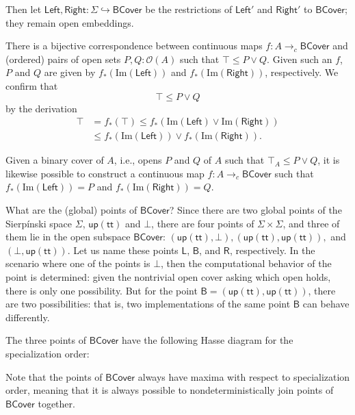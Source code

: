 \documentclass[conference]{IEEEtran}
\newcommand{\hookto}{\hookrightarrow}
\newcommand{\cto}{\to_c}
\newcommand{\Open}[1]{\mathcal{O}({#1})}
\newcommand{\Img}[1]{\text{Im}\left({#1}\right)}
\newcommand{\strue}{\mathsf{up}(\mathsf{tt})}
\newcommand{\sfalse}{\bot}
\newcommand{\BCover}{\mathsf{BCover}}
\begin{document}
Then let $\mathsf{Left}, \mathsf{Right} : \Sigma \hookto \BCover$ be the restrictions of $\mathsf{Left}'$ and $\mathsf{Right}'$ to $\BCover$; they remain open embeddings.

There is a bijective correspondence between continuous maps $f : A \cto \BCover$ and (ordered) pairs of open sets $P, Q : \Open{A}$ such that $\top \le P \vee Q$. Given such an $f$, $P$ and $Q$ are given by $f_*(\Img{\mathsf{Left}})$ and $f_*(\Img{\mathsf{Right}})$, respectively. We confirm that
\[
\top \le P \vee Q
\]
by the derivation
\begin{align*}
\top &= f_*(\top) 
  \le f_*(\Img{\mathsf{Left}} \vee \Img{\mathsf{Right}})
 \\ &\le f_*(\Img{\mathsf{Left}}) \vee f_*(\Img{\mathsf{Right}}).
\end{align*}

Given a binary cover of $A$, i.e., opens $P$ and $Q$ of $A$ such that $\top_A \le P \vee Q$, it is likewise possible to construct a continuous map $f: A \cto \BCover$ such that $f_*(\Img{\mathsf{Left}}) = P$ and $f_*(\Img{\mathsf{Right}}) = Q$.

What are the (global) points of $\BCover$? Since there are two global points of the Sierp\'inski space $\Sigma$, $\strue$ and $\sfalse$, there are four points of $\Sigma \times \Sigma$, and three of them lie in the open subspace $\BCover$: $(\strue, \sfalse), (\strue, \strue),$ and $(\sfalse, \strue)$. Let us name these points $\mathsf{L}$, $\mathsf{B}$, and $\mathsf{R}$, respectively. In the scenario where one of the points is $\sfalse$, then the computational behavior of the point is determined: given the nontrivial open cover asking which open holds, there is only one possibility. But for the point $\mathsf{B} = (\strue, \strue)$, there are two possibilities: that is, two implementations of the same point $\mathsf{B}$ can behave differently.

The three points of $\BCover$ have the following Hasse diagram for the specialization order:
\begin{center}
\end{center}
Note that the points of $\BCover$ always have maxima with respect to specialization order, meaning that it is always possible to nondeterministically join points of $\BCover$ together.
\end{document}
